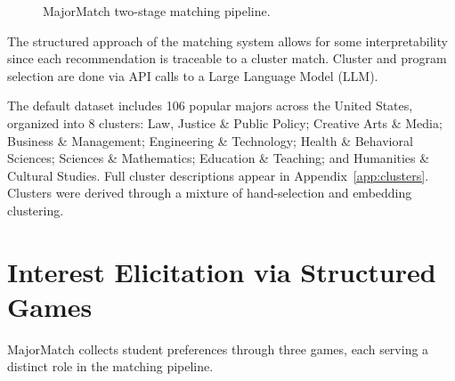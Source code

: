 \begin{figure}[h]
    \centering
    \caption{MajorMatch two-stage matching pipeline.}
    \label{fig:pipeline}
\end{figure}

The structured approach of the matching system allows for some interpretability since each recommendation is traceable to a cluster match. Cluster and program selection are done via API calls to a Large Language Model (LLM). 

The default dataset includes 106 popular majors across the United States, organized into 8 clusters: Law, Justice \& Public Policy; Creative Arts \& Media; Business \& Management; Engineering \& Technology; Health \& Behavioral Sciences; Sciences \& Mathematics; Education \& Teaching; and Humanities \& Cultural Studies. Full cluster descriptions appear in Appendix~\ref{app:clusters}. Clusters were derived through a mixture of hand-selection and embedding clustering.

\section{Interest Elicitation via Structured Games}

MajorMatch collects student preferences through three games, each serving a distinct role in the matching pipeline.


